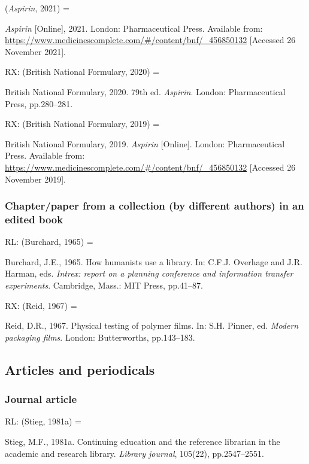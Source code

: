 (\emph{Aspirin}, 2021) = \cite{aspirin2021bnf}

\emph{Aspirin} [Online], 2021. London: Pharmaceutical Press. Available from: \url{https://www.medicinescomplete.com/#/content/bnf/_456850132} [Accessed 26 November 2021].


RX: (British National Formulary, 2020) = \cite{aspirin2020bnf}

British National Formulary, 2020. 79th ed. \emph{Aspirin}. London: Pharmaceutical Press, pp.280--281.


RX: (British National Formulary, 2019) = \cite{aspirin2019bnf}

British National Formulary, 2019. \emph{Aspirin} [Online]. London: Pharmaceutical Press. Available from: \url{https://www.medicinescomplete.com/#/content/bnf/_456850132} [Accessed 26 November 2019].



\subsubsection*{Chapter\slash paper from a collection (by different authors) in an edited book}

RL: (Burchard, 1965) = \cite{burchard1965hhl}

Burchard, J.E., 1965. How humanists use a library. In: C.F.J. Overhage and J.R. Harman, eds. \emph{Intrex: report on a planning conference and information transfer experiments}. Cambridge, Mass.: MIT Press, pp.41--87.


RX: (Reid, 1967) = \cite{reid1967ptp}

Reid, D.R., 1967. Physical testing of polymer films. In: S.H. Pinner, ed. \emph{Modern packaging films}. London: Butterworths, pp.143--183.



\subsection{Articles and periodicals}

\subsubsection*{Journal article}

RL: (Stieg, 1981a) = \cite{stieg1981cer}

Stieg, M.F., 1981a. Continuing education and the reference librarian in the academic and research library. \emph{Library journal}, 105(22), pp.2547--2551.

